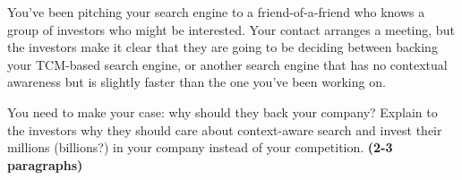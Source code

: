 \documentclass[11pt]{article}
\begin{document}
\begin{enumerate}
  You've been pitching your search engine to a friend-of-a-friend who
  knows a group of investors who might be interested.  Your contact
  arranges a meeting, but the investors make it clear that they
  are going to be deciding between backing your TCM-based search
  engine, or another search engine that has no contextual awareness
  but is slightly faster than the one you've been working on.

You need to make your case: why should they back your company?
Explain to the investors why they should care about context-aware
search and invest their millions (billions?) in your company instead of your
competition.  \textbf{(2-3 paragraphs)}

\end{enumerate}
\end{document}
